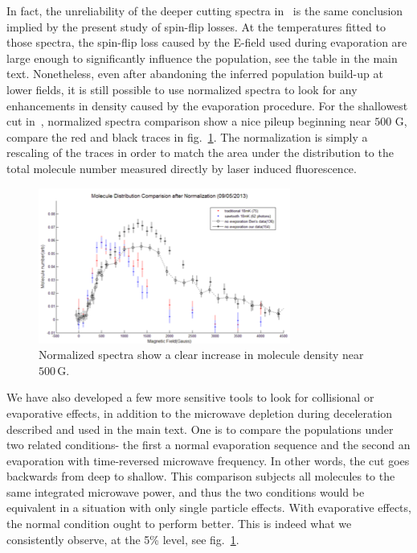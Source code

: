 \documentclass[%
 reprint,
 amsmath,amssymb,
 aps,
prl,
]{revtex4-1}
\begin{document}
In fact, the unreliability of the deeper cutting spectra in~\cite{Stuhl2012evap} is the same conclusion implied by the present study of spin-flip losses.
At the temperatures fitted to those spectra, the spin-flip loss caused by the E-field used during evaporation are large enough to significantly influence the population, see the table in the main text.
Nonetheless, even after abandoning the inferred population build-up at lower fields, it is still possible to use normalized spectra to look for any enhancements in density caused by the evaporation procedure.
For the shallowest cut in~\cite{Sthul2012evap}, normalized spectra comparison show a nice pileup beginning near $500\text{ G}$, compare the red and black traces in fig.~\ref{fig:normenhance}.
The normalization is simply a rescaling of the traces in order to match the area under the distribution to the total molecule number measured directly by laser induced fluorescence.

\begin{figure}[tb]
\includegraphics[width=\linewidth]{SuppFigs/NormEnhance.png}%
\caption{
Normalized spectra show a clear increase in molecule density near $500\,\text{G}$.
}
\label{fig:normenhance}
\end{figure}

We have also developed a few more sensitive tools to look for collisional or evaporative effects, in addition to the microwave depletion during deceleration described and used in the main text.
One is to compare the populations under two related conditions- the first a normal evaporation sequence and the second an evaporation with time-reversed microwave frequency. 
In other words, the cut goes backwards from deep to shallow. 
This comparison subjects all molecules to the same integrated microwave power, and thus the two conditions would be equivalent in a situation with only single particle effects. 
With evaporative effects, the normal condition ought to perform better. 
This is indeed what we consistently observe, at the 5\% level, see fig.~\ref{fig:normenhance}.
\end{document}
